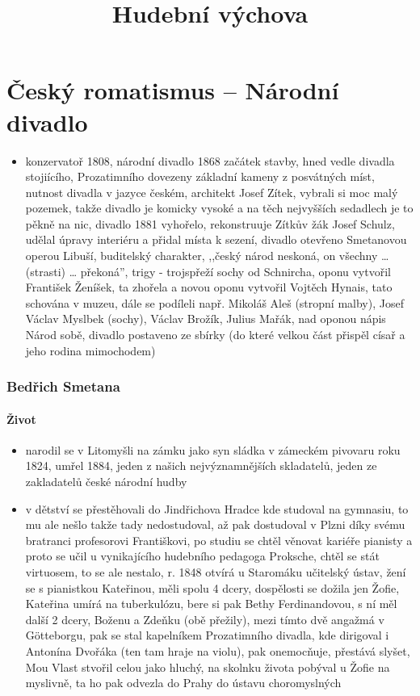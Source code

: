 \documentclass{article}
\title{\vspace{-2cm}\textbf{Hudební výchova}\vspace{-1.7cm}}
\date{}
\author{}
\begin{document}
\maketitle

\part{Český romatismus -- Národní divadlo}
\begin{itemize}
  \item konzervatoř 1808, národní divadlo 1868 začátek stavby, hned vedle divadla stojiícího, Prozatimního dovezeny základní kameny z posvátných míst, nutnost divadla v jazyce českém, architekt Josef Zítek, vybrali si moc malý pozemek, takže divadlo je komicky vysoké a na těch nejvyšších sedadlech je to pěkně na nic, divadlo 1881 vyhořelo, rekonstruuje Zítkův žák Josef Schulz, udělal úpravy interiéru a přidal místa k sezení, divadlo otevřeno Smetanovou operou Libuší, buditelský charakter, ,,český národ neskoná, on všechny … (strasti) … překoná”, trigy - trojspřeží sochy od Schnircha, oponu vytvořil František Ženíšek, ta zhořela a novou oponu vytvořil Vojtěch Hynais, tato schována v muzeu, dále se podíleli např. Mikoláš Aleš (stropní malby), Josef Václav Myslbek (sochy), Václav Brožík, Julius Mařák, nad oponou nápis Národ sobě, divadlo postaveno ze sbírky (do které velkou část přispěl císař a jeho rodina mimochodem)
\end{itemize}

\section{Bedřich Smetana}

\subsection{Život}
\begin{itemize}
  \item narodil se v Litomyšli na zámku jako syn sládka v zámeckém pivovaru roku 1824, umřel 1884, jeden z našich nejvýznamnějších skladatelů, jeden ze zakladatelů české národní hudby
  \item v dětství se přestěhovali do Jindřichova Hradce kde studoval na gymnasiu, to mu ale nešlo takže tady nedostudoval, až pak dostudoval v Plzni díky svému bratranci profesorovi Františkovi, po studiu se chtěl věnovat kariéře pianisty a proto se učil u vynikajícího hudebního pedagoga Proksche, chtěl se stát virtuosem, to se ale nestalo, r. 1848 otvírá u Staromáku učitelský ústav, žení se s pianistkou Kateřinou, měli spolu 4 dcery, dospělosti se dožila jen Žofie, Kateřina umírá na tuberkulózu, bere si pak Bethy Ferdinandovou, s ní měl další 2 dcery, Boženu a Zdeňku (obě přežily), mezi tímto dvě angažmá v Götteborgu, pak se stal kapelníkem Prozatimního divadla, kde dirigoval i Antonína Dvořáka (ten tam hraje na violu), pak onemocňuje, přestává slyšet, Mou Vlast stvořil celou jako hluchý, na skolnku života pobýval u Žofie na myslivně, ta ho pak odvezla do Prahy do ústavu choromyslných
\end{itemize}
\end{document}
